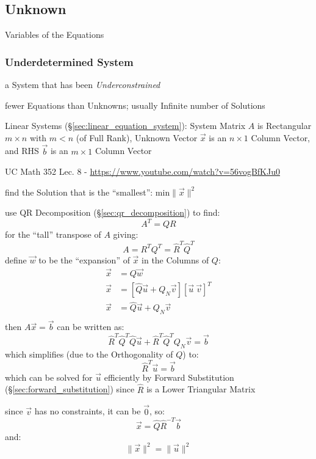 \subsection{Unknown}\label{sec:unknown}

Variables of the Equations



\subsubsection{Underdetermined System}\label{sec:underdetermined_system}

a System that has been \emph{Underconstrained}

fewer Equations than Unknowns; usually Infinite number of Solutions

Linear Systems (\S\ref{sec:linear_equation_system}): System Matrix $A$ is
Rectangular $m \times n$ with $m < n$ (of Full Rank), Unknown Vector $\vec{x}$
is an $n \times 1$ Column Vector, and RHS $\vec{b}$ is an $m \times 1$ Column
Vector

UC Math 352 Lec. 8 - \url{https://www.youtube.com/watch?v=56vogBfKJu0}

find the Solution that is the ``smallest'': $\mathrm{min}\|\vec{x}\|^2$

use QR Decomposition (\S\ref{sec:qr_decomposition}) to find:
\[
  A^T = QR
\]
for the ``tall'' transpose of $A$ giving:
\[
  A = R^T Q^T = \hat{R}^T \hat{Q}^T
\]
define $\vec{w}$ to be the ``expansion'' of $\vec{x}$ in the Columns of $Q$:
\begin{align*}
  \vec{x} & = Q\vec{w} \\
  \vec{x} & = [\hat{Q}\vec{u} + Q_N\vec{v}] [\vec{u} \ \vec{v}]^T \\
  \vec{x} & = \hat{Q}\vec{u} + Q_N\vec{v} \\
\end{align*}
then $A\vec{x} = \vec{b}$ can be written as:
\[
  \hat{R}^T\hat{Q}^T\hat{Q}\vec{u} + \hat{R}^T\hat{Q}^TQ_N\vec{v} = \vec{b}
\]
which simplifies (due to the Orthogonality of $Q$) to:
\[
  \hat{R}^T\vec{u} = \vec{b}
\]
which can be solved for $\vec{u}$ efficiently by Forward Substitution
(\S\ref{sec:forward_substitution}) since $\hat{R}$ is a Lower Triangular Matrix

since $\vec{v}$ has no constraints, it can be $\vec{0}$, so:
\[
  \vec{x} = \hat{Q}\hat{R}^{-T}\vec{b}
\]
and:
\[
  \|\vec{x}\|^2 = \|\vec{u}\|^2
\]



